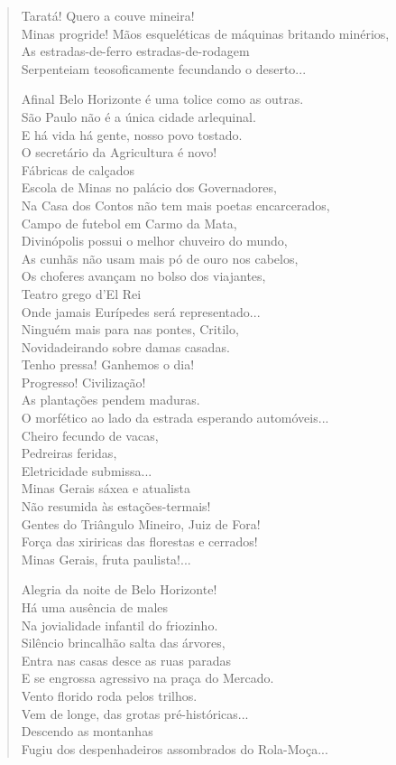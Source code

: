 \begin{verse}
Taratá! Quero a couve mineira!\\
Minas progride!
Mãos esqueléticas de máquinas britando minérios,\\
As estradas-de-ferro estradas-de-rodagem\\
Serpenteiam teosoficamente fecundando o deserto...

Afinal Belo Horizonte é uma tolice como as outras.\\
São Paulo não é a única cidade arlequinal.\\
E há vida há gente, nosso povo tostado.\\
O secretário da Agricultura é novo!\\
Fábricas de calçados\\
Escola de Minas no palácio dos Governadores,\\
Na Casa dos Contos não tem mais poetas encarcerados,\\
Campo de futebol em Carmo da Mata,\\
Divinópolis possui o melhor chuveiro do mundo,\\
As cunhãs não usam mais pó de ouro nos cabelos,\\
Os choferes avançam no bolso dos viajantes,\\
Teatro grego d'El Rei\\
Onde jamais Eurípedes será representado...\\
Ninguém mais para nas pontes, Critilo,\\
Novidadeirando sobre damas casadas.\\
Tenho pressa! Ganhemos o dia!\\
Progresso! Civilização!\\
As plantações pendem maduras.\\
\quad{}O morfético ao lado da estrada esperando automóveis...\\
Cheiro fecundo de vacas,\\
Pedreiras feridas,\\
Eletricidade submissa...\\
Minas Gerais sáxea e atualista\\
Não resumida às estações-termais!\\
Gentes do Triângulo Mineiro, Juiz de Fora!\\
Força das xiriricas das florestas e cerrados!\\
Minas Gerais, fruta paulista!...

Alegria da noite de Belo Horizonte!\\
Há uma ausência de males\\
Na jovialidade infantil do friozinho.\\
Silêncio brincalhão salta das árvores,\\
Entra nas casas desce as ruas paradas\\
E se engrossa agressivo na praça do Mercado.\\
Vento florido roda pelos trilhos.\\
Vem de longe, das grotas pré-históricas...\\
Descendo as montanhas\\
Fugiu dos despenhadeiros assombrados do Rola-Moça...


\end{verse}
